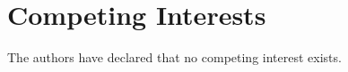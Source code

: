 \section*{Competing Interests}
The authors have declared that no competing interest exists.










